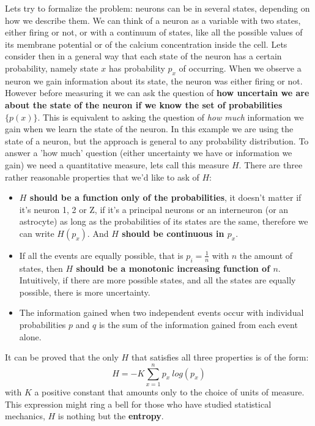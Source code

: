 Lets try to formalize the problem: neurons can be in several states, depending on how we describe them. 
We can think of a neuron as a variable with two states, either firing or not, or with a continuum of states, like all the possible values of its membrane potential or of the calcium concentration inside the cell.
Lets consider then in a general way that each state of the neuron has a certain probability, namely state $x$ has probability $p_x$ of occurring.
When we observe a neuron we gain information about its state, the neuron was either firing or not. 
However before measuring it we can ask the question of \textbf{how uncertain we are about the state of the neuron if we know the set of probabilities $\{p(x)\}$}.
This is equivalent to asking the question of \textit{how much} information we gain when we learn the state of the neuron. 
In this example we are using the state of a neuron, but the approach is general to any probability distribution.
To answer a 'how much' question (either uncertainty we have or information we gain) we need a quantitative measure, lets call this measure $H$.
There are three rather reasonable properties that we'd like to ask of $H$:
\begin{itemize}
    \item \textbf{$H$ should be a function only of the probabilities}, it doesn't matter if it's neuron 1, 2 or Z, if it's a principal neurons or an interneuron (or an astrocyte) as long as the probabilities of its states are the same, therefore we can write $H(p_x)$.
    And \textbf{$H$ should be continuous in $p_x$}.
    \item If all the events are equally possible, that is $p_i=\frac{1}{n}$ with $n$ the amount of states, then \textbf{$H$ should be a monotonic increasing function of $n$}.
    Intuitively, if there are more possible states, and all the states are equally possible, there is more uncertainty.
    \item The information gained when two independent events occur with individual probabilities $p$ and $q$ is the sum of the information gained from each event alone.
\end{itemize}
It can be proved that the only $H$ that satisfies all three properties is of the form: 
\begin{equation}
    H=-K \sum_{x=1}^n p_x\ log (p_x)
\end{equation}
with $K$ a positive constant that amounts only to the choice of units of measure.
This expression might ring a bell for those who have studied statistical mechanics, $H$ is nothing but the \textbf{entropy}. 
